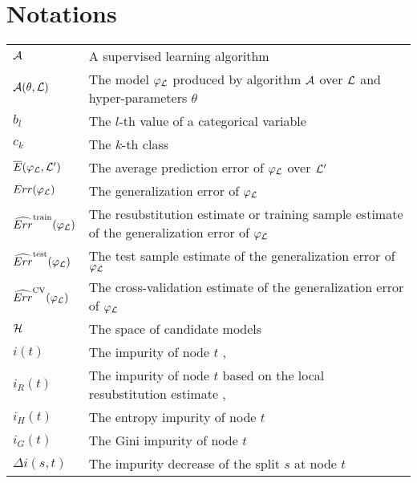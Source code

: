 
\chapter{Notations}

\begin{tabularx}{\textwidth}{ l X }
${\cal A}$ & A supervised learning algorithm \dotfill  \pageref{ntn:A}\\
${\cal A}(\theta, {\cal L})$ & The model $\varphi_{\cal L}$ produced by algorithm ${\cal A}$ over ${\cal L}$ and hyper-parameters $\theta$ \dotfill  \pageref{ntn:A-func}\\
$b_l$ & The $l$-th value of a categorical variable \dotfill  \pageref{ntn:b_l}\\
$c_k$ & The $k$-th class \dotfill  \pageref{ntn:c_k}\\
$\overline{E}(\varphi_{\cal L}, {\cal L}^\prime)$ & The average prediction error of $\varphi_{\cal L}$ over ${\cal L}^\prime$ \dotfill  \pageref{ntn:E_bar}\\
$Err(\varphi_{\cal L})$ & The generalization error of $\varphi_{\cal L}$ \dotfill  \pageref{ntn:err}\\
$\widehat{Err}^\text{train}(\varphi_{\cal L})$ & The resubstitution estimate or training sample estimate of the generalization error of $\varphi_{\cal L}$ \dotfill  \pageref{ntn:err-train}\\
$\widehat{Err}^\text{test}(\varphi_{\cal L})$ & The test sample estimate of the generalization error of $\varphi_{\cal L}$ \dotfill  \pageref{ntn:err-test}\\
$\widehat{Err}^\text{CV}(\varphi_{\cal L})$ & The cross-validation  estimate of the generalization error of $\varphi_{\cal L}$ \dotfill  \pageref{ntn:err-cv}\\
${\cal H}$ & The space of candidate models \dotfill  \pageref{ntn:H}\\
$i(t)$ & The impurity of node $t$ \dotfill  \pageref{ntn:i_t}, \pageref{ntn:i_t2}\\
$i_R(t)$ & The impurity of node $t$ based on the local resubstitution estimate \dotfill \pageref{ntn:i_t_R},~\pageref{eqn:impurity:variance}\\
$i_H(t)$ & The entropy impurity of node $t$ \dotfill  \pageref{eqn:impurity:shannon}\\
$i_G(t)$ & The Gini impurity of node $t$ \dotfill  \pageref{eqn:impurity:gini}\\
$\Delta i(s, t)$ & The impurity decrease of the split $s$ at node $t$ \dotfill  \pageref{ntn:delta-i_t}\\

\end{tabularx}
